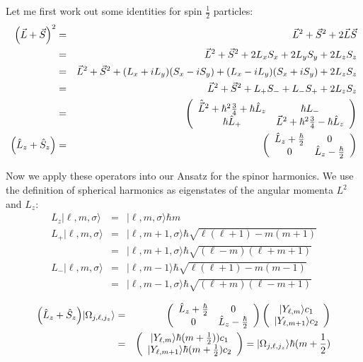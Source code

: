 \documentclass[11pt,a4paper]{report}
\begin{document}
Let me first work out some identities for spin $\frac{1}{2}$ particles:
\begin{eqnarray*}
\Bigl(\vec{L}+\vec{S}\Bigr)^2
&=&\vec{L}^2+\vec{S}^2+2\vec{L}\vec{S}
\\
&=&\vec{L}^2+\vec{S}^2+2L_xS_x+2L_yS_y+2L_zS_z
\\
&=&\vec{L}^2+\vec{S}^2+(L_x+iL_y)(S_x-iS_y)+(L_x-iL_y)(S_x+iS_y)+2L_zS_z
\\
&=&\vec{L}^2+\vec{S}^2+L_+S_-+L_-S_++2L_zS_z
\\
&=&\left(\begin{array}{cc}\hat{\vec{L}}^2+\hbar^2\frac{3}{4}+\hbar\hat{L}_z&\hbar L_-\\
\hbar\hat{L}_+&\vec{L}^2+\hbar^2\frac{3}{4}-\hbar\hat{L}_z\end{array}\right)
\\
\Bigl(\hat{L}_z+\hat{S}_z\Bigr)&=&\left(\begin{array}{cc}
\hat{L}_z+\frac{\hbar}{2} & 0\\0 & \hat{L}_z-\frac{\hbar}{2}\end{array}\right)
\end{eqnarray*}

Now we apply these operators into our Ansatz
 for the spinor harmonics.  We use the
definition of spherical harmonics as eigenstates of the angular
momenta $L^2$ and $L_z$:
\begin{eqnarray*}
L_z|\ell,m,\sigma\rangle&=&|\ell,m,\sigma\rangle\hbar m
\\
L_+|\ell,m,\sigma\rangle&=&|\ell,m+1,\sigma\rangle\hbar\sqrt{\ell(\ell+1)-m(m+1)}
\\
&=&|\ell,m+1,\sigma\rangle\hbar\sqrt{(\ell-m)(\ell+m+1)}
\\
L_-|\ell,m,\sigma\rangle&=&|\ell,m-1\rangle\hbar\sqrt{\ell(\ell+1)-m(m-1)}
\\
&=&|\ell,m-1,\sigma\rangle\hbar\sqrt{(\ell+m)(\ell-m+1)}
\end{eqnarray*}

\begin{eqnarray*}
\Bigl(\hat{L}_z+\hat{S}_z\Bigr)|\Omega_{j,\ell,j_z}\rangle
&=&\left(\begin{array}{cc}
\hat{L}_z+\frac{\hbar}{2} & 0\\0 & \hat{L}_z-\frac{\hbar}{2}\end{array}\right)
\left(\begin{array}{c}|Y_{\ell,m}\rangle c_1\\|Y_{\ell,m+1}\rangle c_2\end{array}\right)
\\
&=&
\left(\begin{array}{c}|Y_{\ell,m}\rangle\hbar(m+\frac{1}{2})) c_1\\|Y_{\ell,m+1}\rangle\hbar(m+\frac{1}{2}) c_2\end{array}\right)
=|\Omega_{j,\ell,j_z}\rangle \hbar(m+\frac{1}{2})
\end{eqnarray*}
\end{document}
